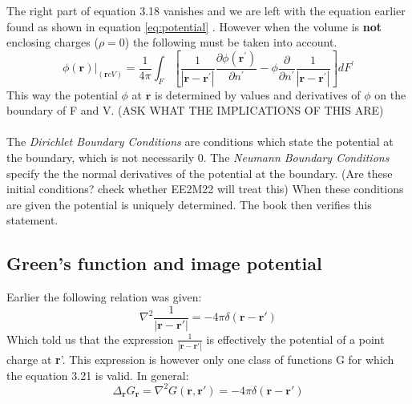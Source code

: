 The right part of equation 3.18 vanishes and we are left with the equation earlier found as shown in equation \ref{eq:potential} .
However when the volume is \textbf{not} enclosing charges ($\rho = 0$) the following must be taken into account.
\begin{equation}
    \left.\phi(\mathbf{r})\right|_{(\mathbf{r} c V)}=\frac{1}{4 \pi} \int_{F}\left[\frac{1}{\left|\mathbf{r}-\mathbf{r}^{\prime}\right|} \frac{\partial \phi\left(\mathbf{r}^{\prime}\right)}{\partial n^{\prime}}-\phi \frac{\partial}{\partial n^{\prime}} \frac{1}{\left|\mathbf{r}-\mathbf{r}^{\prime}\right|}\right] d F^{\prime}
\end{equation}
This way the potential $\phi$ at $\textbf{r}$ is determined by values and derivatives of $\phi$ on the boundary of F and V. (ASK WHAT THE IMPLICATIONS OF THIS ARE)\\\
\\
\noindent The \textit{Dirichlet Boundary Conditions} are conditions which state the potential at the boundary, which is not necessarily 0. 
The \textit{Neumann Boundary Conditions} specify the the normal derivatives of the potential at the boundary. (Are these initial conditions? check whether EE2M22 will treat this)
When these conditions are given the potential is uniquely determined. The book then verifies this statement. 
\subsection{Green's function and image potential}
Earlier the following relation was given:
\begin{equation}
    \nabla^2 \frac{1}{|\textbf{r}-\textbf{r}'|} = -4\pi \delta(\textbf{r}-\textbf{r}')
\end{equation}
Which told us that the expression $\displaystyle \frac{1}{|\textbf{r}-\textbf{r}'|}$ is effectively the potential of a point charge at \textbf{r}'.
This expression is however only one class of functions G for which the equation 3.21 is valid. In general:
\begin{equation}
    \Delta_{\textbf{r}} G_{\textbf{r}} = \nabla ^2 G(\textbf{r},\textbf{r}') = -4\pi \delta(\textbf{r}- \textbf{r}')
\end{equation}
